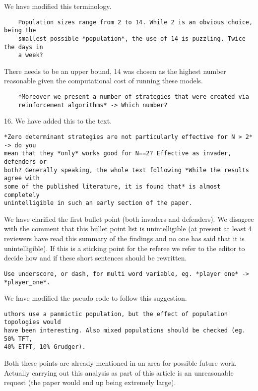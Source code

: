 \documentclass[a4]{article}
\begin{document}
We have modified this terminology.

\begin{verbatim}
    Population sizes range from 2 to 14. While 2 is an obvious choice, being the
    smallest possible *population*, the use of 14 is puzzling. Twice the days in
    a week?
\end{verbatim}

There needs to be an upper bound, 14 was chosen as the highest number reasonable
given the computational cost of running these models.

\begin{verbatim}
    *Moreover we present a number of strategies that were created via
    reinforcement algorithms* -> Which number?
\end{verbatim}

16. We have added this to the text.

\begin{verbatim}
*Zero determinant strategies are not particularly effective for N > 2* -> do you
mean that they *only* works good for N==2? Effective as invader, defenders or
both? Generally speaking, the whole text following *While the results agree with
some of the published literature, it is found that* is almost completely
unintelligible in such an early section of the paper.
\end{verbatim}

We have clarified the first bullet point (both invaders and defenders). We
disagree with the comment that this bullet point list is unintelligible (at
present at least 4 reviewers have read this summary of the findings and no one
has said that it is unintelligible). If this
is a sticking point for the referee we refer to the editor to decide how and if
these short sentences should be rewritten.

\begin{verbatim}
Use underscore, or dash, for multi word variable, eg. *player one* ->
*player_one*.
\end{verbatim}

We have modified the pseudo code to follow this suggestion.

\begin{verbatim}
uthors use a panmictic population, but the effect of population topologies would
have been interesting. Also mixed populations should be checked (eg. 50% TFT,
40% ETFT, 10% Grudger).
\end{verbatim}

Both these points are already mentioned in an area for possible future work.
Actually carrying out this analysis as part of this article is an unreasonable
request (the paper would end up being extremely large).
\end{document}
